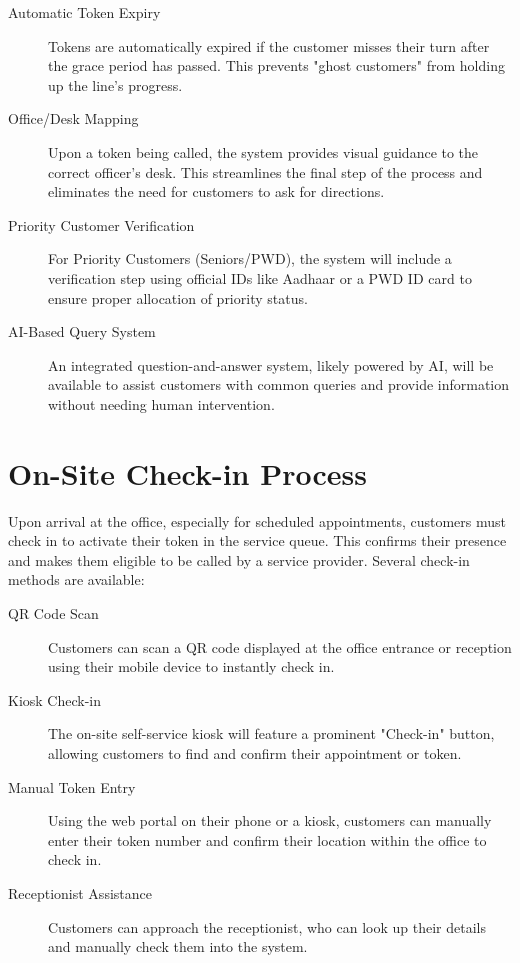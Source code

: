 \documentclass[12pt,a4paper]{report}
\begin{document}
\begin{description}
    \item[Automatic Token Expiry] Tokens are automatically expired if the customer misses their turn after the grace period has passed. This prevents "ghost customers" from holding up the line's progress.
    \item[Office/Desk Mapping] Upon a token being called, the system provides visual guidance to the correct officer's desk. This streamlines the final step of the process and eliminates the need for customers to ask for directions.
    \item[Priority Customer Verification] For Priority Customers (Seniors/PWD), the system will include a verification step using official IDs like Aadhaar or a PWD ID card to ensure proper allocation of priority status.
    \item[AI-Based Query System] An integrated question-and-answer system, likely powered by AI, will be available to assist customers with common queries and provide information without needing human intervention.
\end{description}

\section{On-Site Check-in Process}

Upon arrival at the office, especially for scheduled appointments, customers must check in to activate their token in the service queue. This confirms their presence and makes them eligible to be called by a service provider. Several check-in methods are available:

\begin{description}
    \item[QR Code Scan] Customers can scan a QR code displayed at the office entrance or reception using their mobile device to instantly check in.
    \item[Kiosk Check-in] The on-site self-service kiosk will feature a prominent "Check-in" button, allowing customers to find and confirm their appointment or token.
    \item[Manual Token Entry] Using the web portal on their phone or a kiosk, customers can manually enter their token number and confirm their location within the office to check in.
    \item[Receptionist Assistance] Customers can approach the receptionist, who can look up their details and manually check them into the system.
\end{description}
\end{document}
